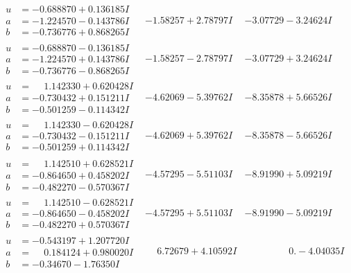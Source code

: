 \documentclass[1p]{elsarticle_modified}
\theoremstyle{definition}
\begin{document}
$$\begin{array}{c|c|c}
\begin{aligned}
u &= -0.688870 + 0.136185 I \\
a &= -1.224570 - 0.143786 I \\
b &= -0.736776 + 0.868265 I\end{aligned}
 & -1.58257 + 2.78797 I & -3.07729 - 3.24624 I \\ \hline\begin{aligned}
u &= -0.688870 - 0.136185 I \\
a &= -1.224570 + 0.143786 I \\
b &= -0.736776 - 0.868265 I\end{aligned}
 & -1.58257 - 2.78797 I & -3.07729 + 3.24624 I \\ \hline\begin{aligned}
u &= \phantom{-}1.142330 + 0.620428 I \\
a &= -0.730432 + 0.151211 I \\
b &= -0.501259 - 0.114342 I\end{aligned}
 & -4.62069 - 5.39762 I & -8.35878 + 5.66526 I \\ \hline\begin{aligned}
u &= \phantom{-}1.142330 - 0.620428 I \\
a &= -0.730432 - 0.151211 I \\
b &= -0.501259 + 0.114342 I\end{aligned}
 & -4.62069 + 5.39762 I & -8.35878 - 5.66526 I \\ \hline\begin{aligned}
u &= \phantom{-}1.142510 + 0.628521 I \\
a &= -0.864650 + 0.458202 I \\
b &= -0.482270 - 0.570367 I\end{aligned}
 & -4.57295 - 5.51103 I & -8.91990 + 5.09219 I \\ \hline\begin{aligned}
u &= \phantom{-}1.142510 - 0.628521 I \\
a &= -0.864650 - 0.458202 I \\
b &= -0.482270 + 0.570367 I\end{aligned}
 & -4.57295 + 5.51103 I & -8.91990 - 5.09219 I \\ \hline\begin{aligned}
u &= -0.543197 + 1.207720 I \\
a &= \phantom{-}0.184124 + 0.980020 I \\
b &= -0.34670 - 1.76350 I\end{aligned}
 & \phantom{-}6.72679 + 4.10592 I & \phantom{-0.000000 } 0. - 4.04035 I \\ \hline\begin{aligned}

\end{aligned}
\end{array}$$
\end{document}
